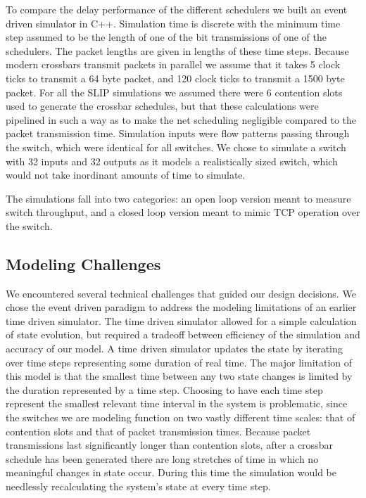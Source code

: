 \documentclass[11pt]{article}%
\begin{document}
To compare the delay performance of the different schedulers we built an event driven simulator in C++.  Simulation time is discrete with the minimum time step assumed to be the length of one of the bit transmissions of one of the schedulers.   The packet lengths are given in lengths of these time steps.  Because modern crossbars transmit packets in parallel we assume that it takes 5 clock ticks to transmit a 64 byte packet, and 120 clock ticks to transmit a 1500 byte packet.  For all the SLIP simulations we assumed there were $6$ contention slots used to generate the crossbar schedules, but that these calculations were pipelined in such a way as to make the net scheduling negligible compared to the packet transmission time.  Simulation inputs were flow patterns passing through the switch, which were identical for all switches.  We chose to simulate a switch with 32 inputs and 32 outputs as it models a realistically sized switch, which would not take inordinant amounts of time to simulate.%

 The simulations fall into two categories: an open loop version meant to measure switch throughput, and a closed loop version meant to mimic TCP operation over the switch.  
 \subsection{Modeling Challenges}
 We encountered several technical challenges that guided our design decisions.%
 We chose the event driven paradigm to address the modeling limitations of an earlier time driven simulator.  The time driven simulator allowed for a simple calculation of state evolution, but required a tradeoff between efficiency of the simulation and accuracy of our model.  A time driven simulator updates the state by iterating over time steps representing some duration of real time.  The major limitation of this model is that the smallest time between any two state changes is limited by the duration represented by a time step.  Choosing to have each time step represent the smallest relevant time interval in the system is problematic, since the switches we are modeling function on two vastly different time scales: that of contention slots and that of packet transmission times.  Because packet transmissions last significantly longer than contention slots, after a crossbar schedule has been generated there are long stretches of time in which no meaningful changes in state occur.  During this time the simulation would be needlessly recalculating the system's state at every time step.
 
\end{document}

